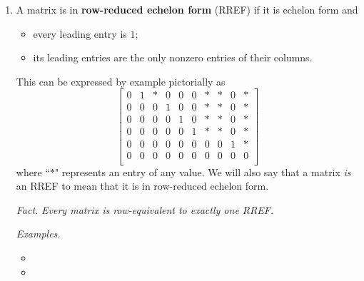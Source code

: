 \begin{enumerate}
  \textit{Facts.}
  \begin{itemize}
  \item
    \textit{Echelon forms can be used to determine consistency.}
    Let $A$ be the augmented matrix of a linear system.  The system is
    inconsistent if and only if every echelon form of $A$ has a row of
    the form
    \begin{displaymath}
      \begin{bmatrix}
        0 \dots & 0 & b
      \end{bmatrix}
    \end{displaymath}
    where $b \neq 0$.
  \end{itemize}

  \textit{Examples.}
  \begin{itemize}
  \item
  \end{itemize}
\item A matrix is in \textbf{row-reduced echelon form} (RREF) if it is echelon form and
  \begin{itemize}
  \item every leading entry is $1$;
  \item its leading entries are the only nonzero entries of their columns.
  \end{itemize}
  This can be expressed by example pictorially as
  \begin{displaymath}
    \begin{bmatrix}
      0&1&*&0&0&0&*&*&0&*\\
      0&0&0&1&0&0&*&*&0&*\\
      0&0&0&0&1&0&*&*&0&*\\
      0&0&0&0&0&1&*&*&0&*\\
      0&0&0&0&0&0&0&0&1&*\\
      0&0&0&0&0&0&0&0&0&0\\
    \end{bmatrix}
  \end{displaymath}
  where ``$*$" represents an entry of any value.  We will also say
  that a matrix \textit{is} an RREF to mean that it is in row-reduced
  echelon form.

  \textit{Fact.} \textit{Every matrix is row-equivalent to exactly one RREF.}

  \textit{Examples.}
  \begin{itemize}
  \item {}
  \item {}
  \end{itemize}


\end{enumerate}
